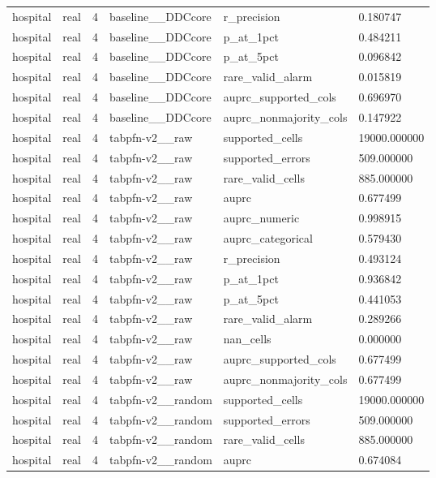 \begin{tabular}{llllll}
hospital & real & 4 & baseline\_\_DDCcore & r\_precision & 0.180747 \\
hospital & real & 4 & baseline\_\_DDCcore & p\_at\_1pct & 0.484211 \\
hospital & real & 4 & baseline\_\_DDCcore & p\_at\_5pct & 0.096842 \\
hospital & real & 4 & baseline\_\_DDCcore & rare\_valid\_alarm & 0.015819 \\
hospital & real & 4 & baseline\_\_DDCcore & auprc\_supported\_cols & 0.696970 \\
hospital & real & 4 & baseline\_\_DDCcore & auprc\_nonmajority\_cols & 0.147922 \\
hospital & real & 4 & tabpfn-v2\_\_raw & supported\_cells & 19000.000000 \\
hospital & real & 4 & tabpfn-v2\_\_raw & supported\_errors & 509.000000 \\
hospital & real & 4 & tabpfn-v2\_\_raw & rare\_valid\_cells & 885.000000 \\
hospital & real & 4 & tabpfn-v2\_\_raw & auprc & 0.677499 \\
hospital & real & 4 & tabpfn-v2\_\_raw & auprc\_numeric & 0.998915 \\
hospital & real & 4 & tabpfn-v2\_\_raw & auprc\_categorical & 0.579430 \\
hospital & real & 4 & tabpfn-v2\_\_raw & r\_precision & 0.493124 \\
hospital & real & 4 & tabpfn-v2\_\_raw & p\_at\_1pct & 0.936842 \\
hospital & real & 4 & tabpfn-v2\_\_raw & p\_at\_5pct & 0.441053 \\
hospital & real & 4 & tabpfn-v2\_\_raw & rare\_valid\_alarm & 0.289266 \\
hospital & real & 4 & tabpfn-v2\_\_raw & nan\_cells & 0.000000 \\
hospital & real & 4 & tabpfn-v2\_\_raw & auprc\_supported\_cols & 0.677499 \\
hospital & real & 4 & tabpfn-v2\_\_raw & auprc\_nonmajority\_cols & 0.677499 \\
hospital & real & 4 & tabpfn-v2\_\_random & supported\_cells & 19000.000000 \\
hospital & real & 4 & tabpfn-v2\_\_random & supported\_errors & 509.000000 \\
hospital & real & 4 & tabpfn-v2\_\_random & rare\_valid\_cells & 885.000000 \\
hospital & real & 4 & tabpfn-v2\_\_random & auprc & 0.674084 \\

\end{tabular}
